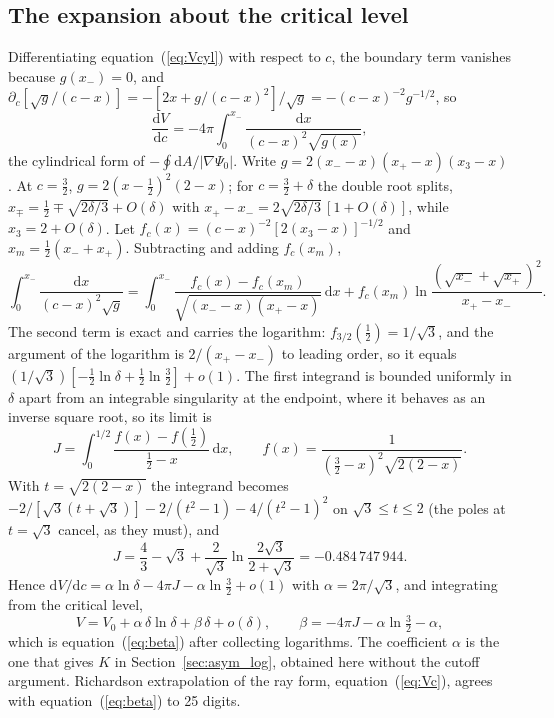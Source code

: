 \documentclass[twocolumn]{aastex702}
\newcommand{\dd}{\mathrm{d}}
\begin{document}
\subsection*{The expansion about the critical level}
Differentiating equation~(\ref{eq:Vcyl}) with respect to $c$, the boundary term vanishes because $g(x_-)=0$, and $\partial_c[\sqrt g/(c-x)]=-[2x+g/(c-x)^2]/\sqrt g=-(c-x)^{-2}g^{-1/2}$, so
\begin{equation}
\frac{\dd V}{\dd c}=-4\pi\int_0^{x_-}\frac{\dd x}{(c-x)^2\sqrt{g(x)}},
\label{eq:dVdc}
\end{equation}
the cylindrical form of $-\oint\dd A/|\nabla\Psi_0|$. Write $g=2(x_--x)(x_+-x)(x_3-x)$. At $c=\tfrac32$, $g=2(x-\tfrac12)^2(2-x)$; for $c=\tfrac32+\delta$ the double root splits, $x_\mp=\tfrac12\mp\sqrt{2\delta/3}+O(\delta)$ with $x_+-x_-=2\sqrt{2\delta/3}\,[1+O(\delta)]$, while $x_3=2+O(\delta)$. Let $f_c(x)=(c-x)^{-2}[2(x_3-x)]^{-1/2}$ and $x_m=\tfrac12(x_-+x_+)$. Subtracting and adding $f_c(x_m)$,
\begin{equation}
\int_0^{x_-}\frac{\dd x}{(c-x)^2\sqrt g}=\int_0^{x_-}\frac{f_c(x)-f_c(x_m)}{\sqrt{(x_--x)(x_+-x)}}\,\dd x+f_c(x_m)\ln\frac{(\sqrt{x_-}+\sqrt{x_+})^2}{x_+-x_-}.
\end{equation}
The second term is exact and carries the logarithm: $f_{3/2}(\tfrac12)=1/\sqrt3$, and the argument of the logarithm is $2/(x_+-x_-)$ to leading order, so it equals $(1/\sqrt3)[-\tfrac12\ln\delta+\tfrac12\ln\tfrac32]+o(1)$. The first integrand is bounded uniformly in $\delta$ apart from an integrable singularity at the endpoint, where it behaves as an inverse square root, so its limit is
\begin{equation}
J=\int_0^{1/2}\frac{f(x)-f(\tfrac12)}{\tfrac12-x}\,\dd x,\qquad f(x)=\frac{1}{(\tfrac32-x)^2\sqrt{2(2-x)}}.
\end{equation}
With $t=\sqrt{2(2-x)}$ the integrand becomes $-2/[\sqrt3(t+\sqrt3)]-2/(t^2-1)-4/(t^2-1)^2$ on $\sqrt3\le t\le2$ (the poles at $t=\sqrt3$ cancel, as they must), and
\begin{equation}
J=\frac43-\sqrt3+\frac{2}{\sqrt3}\ln\frac{2\sqrt3}{2+\sqrt3}=-0.484\,747\,944.
\end{equation}
Hence $\dd V/\dd c=\alpha\ln\delta-4\pi J-\alpha\ln\tfrac32+o(1)$ with $\alpha=2\pi/\sqrt3$, and integrating from the critical level,
\begin{equation}
V=V_0+\alpha\,\delta\ln\delta+\beta\,\delta+o(\delta),\qquad
\beta=-4\pi J-\alpha\ln\tfrac32-\alpha,
\end{equation}
which is equation~(\ref{eq:beta}) after collecting logarithms. The coefficient $\alpha$ is the one that gives $K$ in Section~\ref{sec:asym_log}, obtained here without the cutoff argument. Richardson extrapolation of the ray form, equation~(\ref{eq:Vc}), agrees with equation~(\ref{eq:beta}) to 25 digits.
\end{document}
